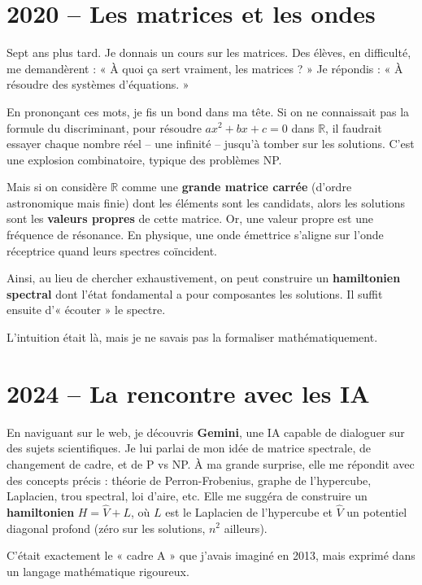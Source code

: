 \documentclass[11pt,a4paper]{article}
\begin{document}
\section{2020 – Les matrices et les ondes}

Sept ans plus tard. Je donnais un cours sur les matrices. Des élèves, en difficulté, me demandèrent : « À quoi ça sert vraiment, les matrices ? » Je répondis : « À résoudre des systèmes d'équations. »

En prononçant ces mots, je fis un bond dans ma tête. Si on ne connaissait pas la formule du discriminant, pour résoudre $ax^2+bx+c=0$ dans $\mathbb{R}$, il faudrait essayer chaque nombre réel – une infinité – jusqu'à tomber sur les solutions. C'est une explosion combinatoire, typique des problèmes NP.

Mais si on considère $\mathbb{R}$ comme une \textbf{grande matrice carrée} (d'ordre astronomique mais finie) dont les éléments sont les candidats, alors les solutions sont les \textbf{valeurs propres} de cette matrice. Or, une valeur propre est une fréquence de résonance. En physique, une onde émettrice s'aligne sur l'onde réceptrice quand leurs spectres coïncident.

Ainsi, au lieu de chercher exhaustivement, on peut construire un \textbf{hamiltonien spectral} dont l'état fondamental a pour composantes les solutions. Il suffit ensuite d'« écouter » le spectre.

L'intuition était là, mais je ne savais pas la formaliser mathématiquement.

\section{2024 – La rencontre avec les IA}

En naviguant sur le web, je découvris \textbf{Gemini}, une IA capable de dialoguer sur des sujets scientifiques. Je lui parlai de mon idée de matrice spectrale, de changement de cadre, et de P vs NP. À ma grande surprise, elle me répondit avec des concepts précis : théorie de Perron-Frobenius, graphe de l'hypercube, Laplacien, trou spectral, loi d'aire, etc. Elle me suggéra de construire un \textbf{hamiltonien} $H = \hat{V} + L$, où $L$ est le Laplacien de l'hypercube et $\hat{V}$ un potentiel diagonal profond (zéro sur les solutions, $n^2$ ailleurs).

C'était exactement le « cadre A » que j'avais imaginé en 2013, mais exprimé dans un langage mathématique rigoureux.
\end{document}
